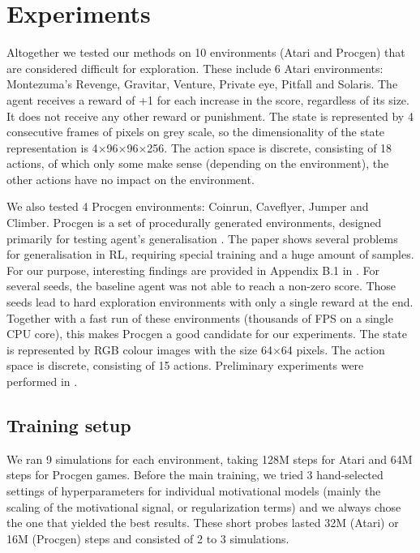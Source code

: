 \documentclass[a4paper,11pt]{elsarticle}
\begin{document}
\section{Experiments}
\label{sec:exper}

Altogether we tested our methods on 10 environments (Atari and Procgen) that are considered difficult for exploration.
These include 6 Atari environments: Montezuma's Revenge, Gravitar, Venture, Private eye, Pitfall and Solaris. The agent receives a reward of +1 for each increase in the score, regardless of its size. It does not receive any other reward or punishment. The state is represented by 4 consecutive frames of pixels on grey scale, so the dimensionality of the state representation is 4$\times$96$\times$96$\times$256. The action space is discrete, consisting of 18 actions, of which only some make sense (depending on the environment), the other actions have no impact on the environment.

We also tested 4 Procgen environments: Coinrun, Caveflyer, Jumper and Climber. Procgen is a set of procedurally generated environments, designed primarily for testing agent's generalisation \citep{cobbe2020procgen}. The paper shows several problems for generalisation in RL, requiring special training and a huge amount of samples. For our purpose, interesting findings are provided in Appendix B.1 in \citep{cobbe2020procgen}. For several seeds, the baseline agent was not able to reach a non-zero score. Those seeds lead to hard exploration environments with only a single reward at the end. Together with a fast run of these environments (thousands of FPS on a single CPU core), this makes Procgen a good candidate for our experiments. The state is represented by RGB colour images with the size 64$\times$64 pixels. The action space is discrete, consisting of 15 actions.
Preliminary experiments were performed in \citep{pechac2022intrinsic}.

\subsection{Training setup}

We ran 9 simulations for each environment, taking 128M steps for Atari and 64M steps for Procgen games. Before the main training, we tried 3 hand-selected settings of hyperparameters for individual motivational models (mainly the scaling of the motivational signal, or regularization terms) and we always chose the one that yielded the best results. These short probes lasted 32M (Atari) or 16M (Procgen) steps and consisted of 2 to 3 simulations. 
\end{document}
